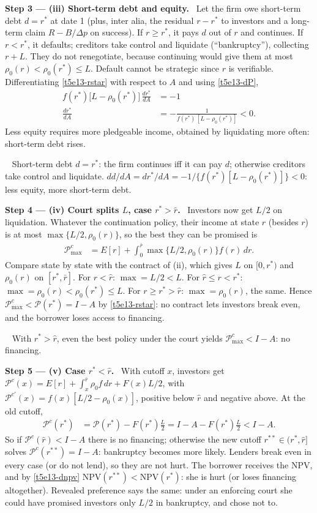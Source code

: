 \documentclass[11pt,a4paper]{article}
\newcommand{\step}[2]{\par\medskip\noindent\textbf{Step #1 --- #2.}~}
\newcommand{\answer}[1]{\par\smallskip\noindent\fbox{\textbf{Answer #1.}}~}
\begin{document}
\step{3}{(iii) Short-term debt and equity} Let the firm owe short-term debt $d=r^*$ at date 1 (plus, inter alia, the residual $r-r^*$ to investors
and a long-term claim $R-B/\Delta p$ on success). If $r\ge r^*$, it pays $d$ out of $r$ and continues. If $r<r^*$, it defaults; creditors take control and
liquidate (``bankruptcy''), collecting $r+L$. They do not renegotiate, because continuing would give them at most
$\rho_0(r)<\rho_0(r^*)\le L$. Default cannot be strategic since $r$ is verifiable. Differentiating \eqref{t5e13-rstar} with respect to $A$ and using \eqref{t5e13-dP},
\begin{align}
  f(r^*)\big[L-\rho_0(r^*)\big]\,\frac{dr^*}{dA} &= -1 \nonumber\\
  \frac{dr^*}{dA} &= -\frac{1}{f(r^*)\,[L-\rho_0(r^*)]} < 0. \label{t5e13-drdA}
\end{align}
Less equity requires more pledgeable income, obtained by liquidating more often: short-term debt rises.

\answer{(iii)} Short-term debt $d=r^*$: the firm continues iff it can pay $d$; otherwise creditors take
control and liquidate. $dd/dA=dr^*/dA=-1/\{f(r^*)[L-\rho_0(r^*)]\}<0$: less equity, more short-term debt.

\step{4}{(iv) Court splits $L$, case $r^*>\hat r$} Investors now get $L/2$ on liquidation. Whatever the continuation policy, their income at state $r$
(besides $r$) is at most $\max\{L/2,\rho_0(r)\}$, so the best they can be promised is
\begin{align}
  \mathcal P^{c}_{\max} &= E[r]+\int_0^{\bar r}\max\{L/2,\rho_0(r)\}f(r)\,dr. \label{t5e13-Pmax}
\end{align}
Compare state by state with the contract of (ii), which gives $L$ on $[0,r^*)$ and $\rho_0(r)$ on $[r^*,\bar r]$. For $r<\hat r$: $\max=L/2<L$. For $\hat r\le r<r^*$:
$\max=\rho_0(r)<\rho_0(r^*)\le L$. For $r\ge r^*>\hat r$: $\max=\rho_0(r)$, the same. Hence $\mathcal P^{c}_{\max}<\mathcal P(r^*)=I-A$ by \eqref{t5e13-rstar}: no contract lets
investors break even, and the borrower loses access to financing.

\answer{(iv)} With $r^*>\hat r$, even the best policy under the court yields $\mathcal P^c_{\max}<I-A$:
no financing.

\step{5}{(v) Case $r^*<\hat r$} With cutoff $x$, investors get $\mathcal P^c(x)=E[r]+\int_x^{\bar r}\rho_0 f\,dr+F(x)L/2$, with
$\mathcal P^{c\prime}(x)=f(x)[L/2-\rho_0(x)]$, positive below $\hat r$ and negative above. At the old cutoff,
\begin{align}
  \mathcal P^c(r^*) &= \mathcal P(r^*)-F(r^*)\frac L2 = I-A-F(r^*)\frac L2 < I-A. \label{t5e13-Pc}
\end{align}
So if $\mathcal P^c(\hat r)<I-A$ there is no financing; otherwise the new cutoff $r^{**}\in(r^*,\hat r]$ solves $\mathcal P^c(r^{**})=I-A$: bankruptcy becomes
more likely. Lenders break even in every case (or do not lend), so they are not hurt. The borrower receives the NPV, and by \eqref{t5e13-dnpv}
$\text{NPV}(r^{**})<\text{NPV}(r^*)$: she is hurt (or loses financing altogether). Revealed preference says the same: under an enforcing court she
could have promised investors only $L/2$ in bankruptcy, and chose not to.
\end{document}
